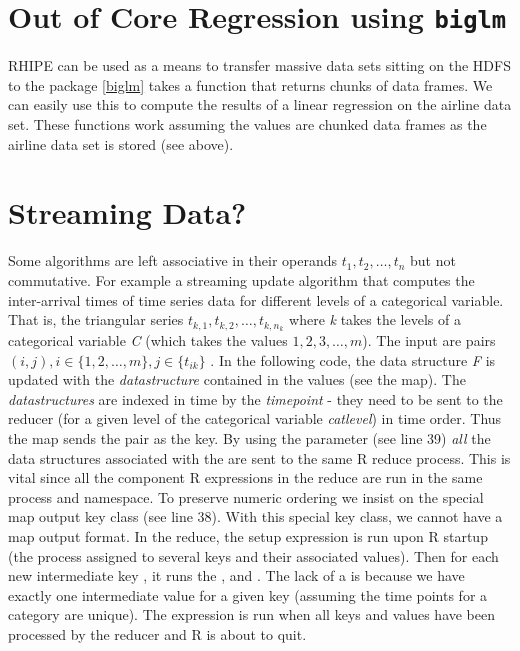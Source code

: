 \documentclass[letterpaper,10pt,english]{sphinxmanual}
\begin{document}
\section{Out of Core Regression using \texttt{biglm}}
\label{airline:index-12}\label{airline:out-of-core-regression-using-biglm}\label{airline:out-of-core-regression}
RHIPE can be used as a means to transfer massive data sets sitting on the HDFS to the package {\hyperref[airline:biglm]{{[}biglm{]}}}
 takes a function that returns chunks of data frames. We can easily use this to compute the results of a linear
regression on the airline data set. These functions work assuming the values are chunked data frames
as the airline data set is stored (see above).


\section{Streaming Data?}
\label{airline:id7}\label{airline:streaming-data}
Some algorithms are left associative in their operands
$t_1,t_2,\ldots,t_n$ but not commutative. For example a streaming update
algorithm that computes the inter-arrival times of time series data for
different levels of a categorical variable. That is, the triangular series
$t_{k,1},t_{k,2},\ldots,t_{k,n_k}$ where \emph{k} takes the levels of a
categorical variable \emph{C} (which takes the values $1,2,3,\ldots,m$). The
input are pairs $(i,j), i \in \{1,2,\ldots,m\}, j \in \{t_{ik}\}$
. In the following code, the data structure \emph{F} is updated with the
\emph{datastructure} contained in the values (see the map). The \emph{datastructures}
are indexed in time by the \emph{timepoint} - they need to be sent to the reducer
(for a given level of the categorical variable \emph{catlevel}) in time order. Thus
the map sends the pair  as the key. By using the
 parameter (see line 39) \emph{all} the data structures associated with the 
are sent to the same R reduce process. This is vital since all the component
R expressions in the reduce are run in the same process and namespace. To
preserve numeric ordering we insist on the special map output key class (see
line 38). With this special key class, we cannot have a map output format.
In the reduce, the setup expression  is run upon R startup (the
process assigned to several keys and their associated values). Then for each new
intermediate key , it runs the ,  and
. The lack of a  is because we have exactly one intermediate
value for a given key (assuming the time points for a category are unique).
The  expression is run when all keys and values have been processed
by the reducer and R is about to quit.
\end{document}
